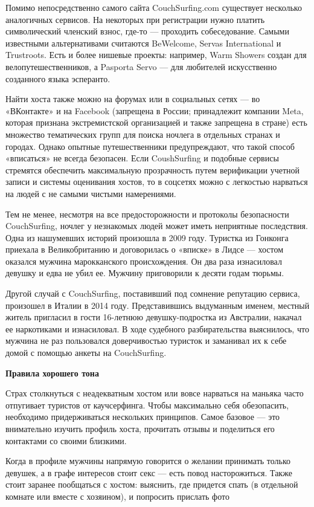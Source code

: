 Помимо непосредственно самого сайта CouchSurfing.com существует несколько аналогичных сервисов. На некоторых при регистрации нужно платить символический членский взнос, где-то — проходить собеседование. Самыми известными альтернативами считаются BeWelcome, Servas International и Trustroots. Есть и более нишевые проекты: например, Warm Showers создан для велопутешественников, а Pasporta Servo — для любителей искусственно созданного языка эсперанто.

Найти хоста также можно на форумах или в социальных сетях — во «ВКонтакте» и на Facebook (запрещена в России; принадлежит компании Meta, которая признана экстремистской организацией и также запрещена в стране) есть множество тематических групп для поиска ночлега в отдельных странах и городах. Однако опытные путешественники предупреждают, что такой способ «вписаться» не всегда безопасен. Если CoushSurfing и подобные сервисы стремятся обеспечить максимальную прозрачность путем верификации учетной записи и системы оценивания хостов, то в соцсетях можно с легкостью нарваться на людей с не самыми чистыми намерениями.

Тем не менее, несмотря на все предосторожности и протоколы безопасности CouchSurfing, ночлег у незнакомых людей может иметь неприятные последствия. Одна из нашумевших историй произошла в 2009 году. Туристка из Гонконга приехала в Великобританию и договорилась о «вписке» в Лидсе — хостом оказался мужчина марокканского происхождения. Он два раза изнасиловал девушку и едва не убил ее. Мужчину приговорили к десяти годам тюрьмы.

Другой случай с CouchSurfing, поставивший под сомнение репутацию сервиса, произошел в Италии в 2014 году. Представившись выдуманным именем, местный житель пригласил в гости 16-летнюю девушку-подростка из Австралии, накачал ее наркотиками и изнасиловал. В ходе судебного разбирательства выяснилось, что мужчина не раз пользовался доверчивостью туристок и заманивал их к себе домой с помощью анкеты на CouchSurfing.

\textbf{Правила хорошего тона}

Страх столкнуться с неадекватным хостом или вовсе нарваться на маньяка часто отпугивает туристов от каучсерфинга. Чтобы максимально себя обезопасить, необходимо придерживаться нескольких принципов. Самое базовое — это внимательно изучить профиль хоста, прочитать отзывы и поделиться его контактами со своими близкими.

\begin{center}
    \Large
    Когда в профиле мужчины напрямую говорится о желании принимать только девушек, а в графе интересов стоит секс — есть повод насторожиться. Также стоит заранее пообщаться с хостом: выяснить, где придется спать (в отдельной комнате или вместе с хозяином), и попросить прислать фото
\end{center}

